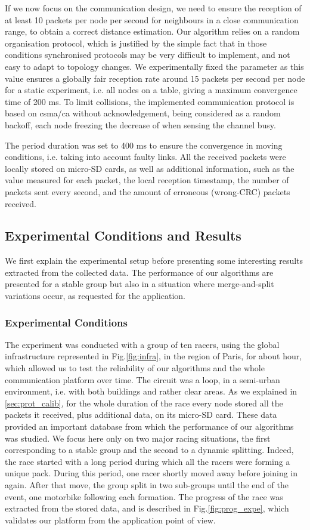 \documentclass{sig-alternate}
\begin{document}
If we now focus on the communication design, we need to ensure the reception of at least 10 packets per node per second for neighbours in a close communication range, to obtain a correct distance estimation.
Our algorithm relies on a random organisation protocol, which is justified by the simple fact that in those conditions synchronised protocols may be very difficult to implement, and not easy to adapt to topology changes. We experimentally fixed the parameter  as this value ensures a globally fair reception rate around 15 packets per second per node for a static experiment, i.e. all nodes on a table, giving a maximum  convergence time of 200 ms. To limit collisions, the implemented communication protocol is based on {\sc csma/ca} without acknowledgement,  being considered as a random backoff, each node freezing the decrease of  when sensing the channel busy.

The period duration was set to 400 ms to ensure the convergence in moving conditions, i.e. taking into account faulty links.
All the received packets were locally stored on micro-SD cards, as well as additional information, such as the {\ed} value measured for each packet, the local reception timestamp, the number of packets sent every second, and the amount of erroneous (wrong-CRC) packets received.


\subsection{Experimental Conditions and Results}
\label{sec-results}
We first explain the experimental setup before presenting some interesting results extracted from the collected data. The performance of our algorithms are presented for a stable group but also in a situation where merge-and-split variations occur, as requested for the application.

\subsubsection{Experimental Conditions}
The experiment was conducted with a group of ten racers, using the global infrastructure represented in Fig.\ref{fig:infra}, in the region of Paris, for about  hour, which allowed us to test the reliability of our algorithms and the whole communication platform over time. The circuit was a  loop, in a semi-urban environment, i.e. with both buildings and rather clear areas. As we explained in \ref{sec:prot_calib}, for the whole duration of the race every node stored all the packets it received, plus additional data, on its micro-SD card. These data provided an important database from which the performance of our algorithms was studied. We focus here only on two major racing situations, the first corresponding to a stable group and the second to a dynamic splitting. Indeed, the race started with a long period during which all the racers were forming a unique pack. During this period, one racer shortly moved away before joining in again. After that move, the group split in two sub-groups until the end of the event, one motorbike following each formation. The progress of the race was extracted from the stored data, and is described in Fig.\ref{fig:prog_expe}, which validates our platform from the application point of view.
\end{document}
